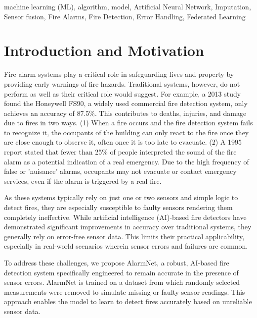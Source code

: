 \documentclass[conference]{IEEEtran}
\begin{document}
\begin{IEEEkeywords}
machine learning (ML), algorithm, model, Artificial Neural
Network, Imputation, Sensor fusion, Fire Alarms, Fire
Detection, Error Handling, Federated Learning
\end{IEEEkeywords}

\section{Introduction and Motivation}\label{intro} 

Fire alarm systems play a critical role in safeguarding
lives and property by providing early warnings of fire
hazards. Traditional systems, however, do not perform as
well as their critical role would suggest. For example, a
2013 study found the Honeywell FS90, a widely used
commercial fire detection system, only achieves an accuracy
of 87.5\%\cite{smokeacc}. This contributes to deaths,
injuries, and damage due to fires in two ways. (1) When a
fire occurs and the fire detection system fails to recognize
it, the occupants of the building can only react to the fire
once they are close enough to observe it, often once it is
too late to evacuate. (2) A 1995 report stated that fewer
than 25\% of people interpreted the sound of the fire alarm
as a potential indication of a real emergency\cite{crywolf}.
Due to the high frequency of false or 'nuisance' alarms,
occupants may not evacuate or contact emergency services,
even if the alarm is triggered by a real fire.

As these systems typically rely on just one or two sensors
and simple logic to detect fires, they are especially
susceptible to faulty sensors rendering them completely
ineffective. While artificial intelligence (AI)-based fire
detectors have demonstrated significant improvements in
accuracy over traditional systems, they generally rely on
error-free sensor data\cite{ai1}\cite{ai2}\cite{ai3}. This
limits their practical applicability, especially in
real-world scenarios wherein sensor errors and failures are
common.

To address these challenges, we propose AlarmNet, a robust,
AI-based fire detection system specifically engineered to
remain accurate in the presence of sensor errors. AlarmNet
is trained on a dataset from which randomly selected
measurements were removed to simulate missing or faulty
sensor readings. This approach enables the model to learn to
detect fires accurately based on unreliable sensor data. 
\end{document}
